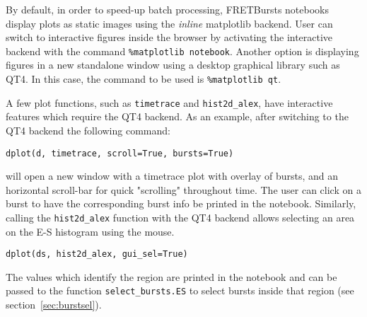 By default, in order to speed-up batch processing, FRETBursts notebooks display plots
as static images using the \textit{inline} matplotlib backend.
User can switch to interactive figures inside the browser by activating
the interactive backend with the command \verb|%matplotlib notebook|.
Another option is displaying figures in a new standalone window
using a desktop graphical library such as QT4.
In this case, the command to be used is \verb|%matplotlib qt|.

A few plot functions, such as \verb|timetrace| and \verb|hist2d_alex|, have interactive features
which require the QT4 backend. As an example, after switching to the QT4 backend
the following command:

\begin{lstlisting}
dplot(d, timetrace, scroll=True, bursts=True)
\end{lstlisting}

\noindent
will open a new window with a timetrace plot with overlay of bursts, and an horizontal scroll-bar for quick
"scrolling" throughout time. The user can click on a burst to have the corresponding burst info
be printed in the notebook.
Similarly, calling the \verb|hist2d_alex| function with the QT4 backend allows
selecting an area on the E-S histogram using the mouse.

\begin{lstlisting}
dplot(ds, hist2d_alex, gui_sel=True)
\end{lstlisting}

The values which identify the region are printed in the notebook and can be passed
to the function \verb|select_bursts.ES| to select bursts inside that region
(see section~\ref{sec:burstsel}).
